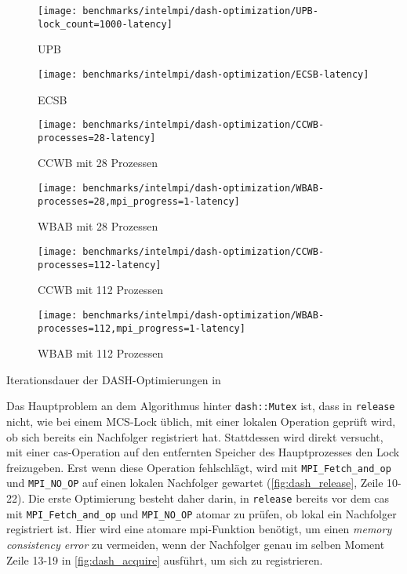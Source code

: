 \begin{benchmark}[!h]
    \begin{subfigure}{.5\textwidth}
        \texttt{[image: benchmarks/intelmpi/dash-optimization/UPB-lock\_count=1000-latency]}
        \caption{UPB}
        \label{ben:dash_upb_latency}
    \end{subfigure}
    \begin{subfigure}{.5\textwidth}
        \texttt{[image: benchmarks/intelmpi/dash-optimization/ECSB-latency]}
        \caption{ECSB}
        \label{ben:dash_ecsb_latency}
    \end{subfigure}
    \begin{subfigure}{.5\textwidth}
        \texttt{[image: benchmarks/intelmpi/dash-optimization/CCWB-processes=28-latency]}
        \caption{CCWB mit 28 Prozessen}
        \label{ben:dash_ccwb_28_latency}
    \end{subfigure}
    \begin{subfigure}{.5\textwidth}
        \texttt{[image: benchmarks/intelmpi/dash-optimization/WBAB-processes=28,mpi\_progress=1-latency]}
        \caption{WBAB mit 28 Prozessen}
        \label{ben:dash_wbab_28_latency}
    \end{subfigure}
    \begin{subfigure}{.5\textwidth}
        \texttt{[image: benchmarks/intelmpi/dash-optimization/CCWB-processes=112-latency]}
        \caption{CCWB mit 112 Prozessen}
        \label{ben:dash_ccwb_112_latency}
    \end{subfigure}
    \begin{subfigure}{.5\textwidth}
        \texttt{[image: benchmarks/intelmpi/dash-optimization/WBAB-processes=112,mpi\_progress=1-latency]}
        \caption{WBAB mit 112 Prozessen}
        \label{ben:dash_wbab_112_latency}
    \end{subfigure}
    \caption{Iterationsdauer der DASH-Optimierungen in }
    \label{fig:dash_latency}
\end{benchmark}

Das Hauptproblem an dem Algorithmus hinter \texttt{dash::Mutex} ist,
dass in \texttt{release} nicht,
wie bei einem MCS-Lock üblich,
mit einer lokalen Operation geprüft wird,
ob sich bereits ein Nachfolger registriert hat.
Stattdessen wird direkt versucht,
mit einer \gls{cas}-Operation auf den entfernten Speicher des Hauptprozesses
den Lock freizugeben.
Erst wenn diese Operation fehlschlägt,
wird mit \texttt{MPI\_Fetch\_and\_op} und \texttt{MPI\_NO\_OP} auf einen lokalen Nachfolger gewartet (\autoref{fig:dash_release}, Zeile 10-22).
Die erste Optimierung besteht daher darin,
in \texttt{release} bereits vor dem \gls{cas} mit \texttt{MPI\_Fetch\_and\_op} und \texttt{MPI\_NO\_OP} atomar zu prüfen,
ob lokal ein Nachfolger registriert ist.
Hier wird eine atomare \gls{mpi}-Funktion benötigt,
um einen \textit{memory consistency error} zu vermeiden,
wenn der Nachfolger genau im selben Moment Zeile 13-19 in \autoref{fig:dash_acquire} ausführt,
um sich zu registrieren.

